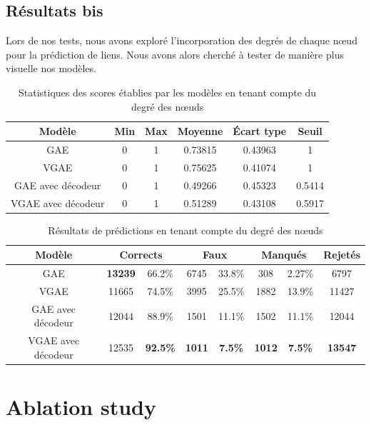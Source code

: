 \documentclass{article}
\begin{document}
\subsection{Résultats bis}
Lors de nos tests, nous avons exploré l'incorporation des degrés de chaque nœud pour la prédiction de liens. Nous avons alors cherché à tester de manière plus visuelle nos modèles.

\begin{table}[H]
    \centering
    \begin{tabular}{|c|c|c|c|c|c|}
        \hline
        Modèle & Min & Max & Moyenne & Écart type & Seuil\\
        \hline
        GAE & 0 & 1 & 0.73815 & 0.43963 & 1\\
        VGAE & 0 & 1 & 0.75625 & 0.41074 & 1\\
        GAE avec décodeur & 0 & 1 & 0.49266 & 0.45323 & 0.5414\\
        VGAE avec décodeur & 0 & 1 & 0.51289 & 0.43108 & 0.5917\\
        \hline
    \end{tabular}
    \caption{Statistiques des scores établies par les modèles en tenant compte du degré des nœuds}
    \label{tab:statistiques_scores_avec_degre}
\end{table}

\begin{table}[H]
    \centering
    \begin{tabular}{|c|c|c|c|c|c|c|c|}
        \hline
        Modèle & \multicolumn{2}{c|}{Corrects} & \multicolumn{2}{c|}{Faux} & \multicolumn{2}{c|}{Manqués} & Rejetés\\
        \hline
        GAE & \textbf{13239} & 66.2\% & 6745 & 33.8\% & 308 & 2.27\% & 6797\\
        VGAE & 11665 & 74.5\% & 3995 & 25.5\% & 1882 & 13.9\% & 11427\\
        GAE avec décodeur & 12044 & 88.9\% & 1501 & 11.1\% & 1502 & 11.1\% & 12044\\
        VGAE avec décodeur & 12535 & \textbf{92.5\%} & \textbf{1011} & \textbf{7.5\%} & \textbf{1012} & \textbf{7.5\%} & \textbf{13547}\\
         \hline
    \end{tabular}
    \caption{Résultats de prédictions en tenant compte du degré des nœuds}
    \label{tab:resultats_reconstruction_avec_degre}
\end{table}


\section{Ablation study}
\end{document}

